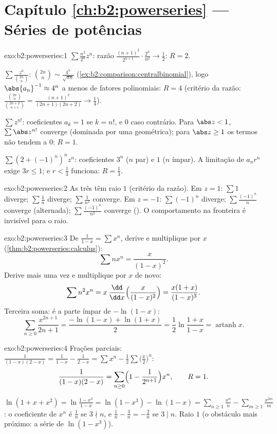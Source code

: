 \section*{Capítulo \ref{ch:b2:powerseries} --- Séries de potências}

\begin{solution}{exo:b2:powerseries:1}
$\sum \frac{n^2}{2^n}z^n$: razão $\frac{(n+1)^2}{2^{n+1}}\cdot
\frac{2^n}{n^2} \to \frac12$: $R = 2$.

$\sum \frac{z^n}{\binom{2n}{n}}$: $\binom{2n}{n} \sim
\frac{4^n}{\sqrt{\pi n}}$ (\cref{ex:b2:comparison:centralbinomial}),
logo $\abs{a_n}^{-1} \approx 4^n$ a menos de fatores polinomiais: $R = 4$
(critério da razão: $\frac{\binom{2n}{n}}{\binom{2n+2}{n+1}} =
\frac{(n+1)^2}{(2n+1)(2n+2)} \to \frac14$).

$\sum z^{n!}$: coeficientes $a_k = 1$ se $k = n!$, e $0$ caso contrário. Para
$\abs z < 1$, $\sum \abs z^{n!}$ converge (dominada por uma geométrica);
para $\abs z \geq 1$ os termos não tendem a $0$: $R = 1$.

$\sum (2 + (-1)^n)^n z^n$: coeficientes $3^n$ ($n$ par) e $1$
($n$ ímpar). A limitação de $a_nr^n$ exige $3r \leq 1$; e $r <
\frac13$ funciona: $R = \frac13$.
\end{solution}

\begin{solution}{exo:b2:powerseries:2}
As três têm raio $1$ (critério da razão). Em $z = 1$: $\sum 1$
diverge; $\sum\frac1n$ diverge; $\sum\frac{1}{n^2}$ converge. Em
$z = -1$: $\sum(-1)^n$ diverge; $\sum\frac{(-1)^n}{n}$ converge
(alternada); $\sum\frac{(-1)^n}{n^2}$ converge ().
O comportamento na fronteira é invisível para o raio.
\end{solution}

\begin{solution}{exo:b2:powerseries:3}
De $\frac{1}{1-x} = \sum x^n$, derive e multiplique por $x$
(\cref{thm:b2:powerseries:calculus}):
\[
\sum n x^n = \frac{x}{(1-x)^2} .
\]
Derive mais uma vez e multiplique por $x$ de novo:
\[
\sum n^2 x^n = x\,\frac{\dd}{\dd x}\Bigl(\frac{x}{(1-x)^2}\Bigr)
= \frac{x(1 + x)}{(1-x)^3} .
\]
Terceira soma: é a parte ímpar de $-\ln(1 - x)$:
\[
\sum_{n\geq0} \frac{x^{2n+1}}{2n+1}
= \frac{-\ln(1-x) + \ln(1+x)}{2}
= \frac12 \ln\frac{1+x}{1-x}
= \operatorname{artanh} x .
\]
\end{solution}

\begin{solution}{exo:b2:powerseries:4}
Frações parciais: $\frac{1}{(1-x)(2-x)} = \frac{1}{1-x} -
\frac{1}{2 - x} = \sum x^n - \frac12\sum \bigl(\frac x2\bigr)^n$:
\[
\frac{1}{(1-x)(2-x)} = \sum_{n\geq0} \Bigl(1 -
\frac{1}{2^{n+1}}\Bigr)x^n,
\qquad R = 1 .
\]

$\ln(1 + x + x^2) = \ln\frac{1 - x^3}{1 - x} = \ln(1 - x^3) -
\ln(1 - x) = \sum_{n\geq1}\frac{x^n}{n} -
\sum_{m\geq1}\frac{x^{3m}}{m}$: o coeficiente de $x^n$ é
$\frac1n$ se $3 \nmid n$, e $\frac1n - \frac{3}{n} = -\frac2n$ se
$3 \mid n$. Raio $1$ (o obstáculo mais próximo: a série de
$\ln(1-x^3)$).
\end{solution}

